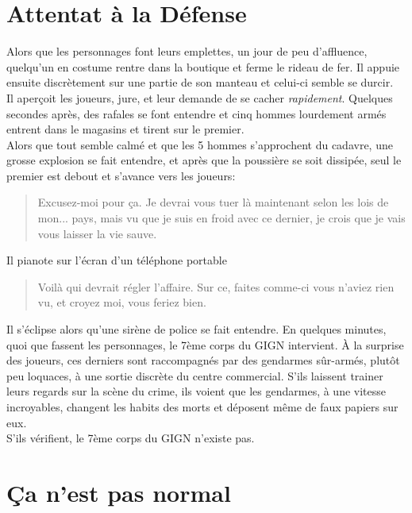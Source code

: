 \documentclass[10pt,a4paper,twocolumn]{article}
\begin{document}
\section{Attentat à la Défense}
Alors que les personnages font leurs emplettes, un jour de peu d'affluence, quelqu'un en costume rentre dans la boutique et ferme le rideau de fer. Il appuie ensuite discrètement sur une partie de son manteau et celui-ci semble se durcir.\\
Il aperçoit les joueurs, jure, et leur demande de se cacher \emph{rapidement}. Quelques secondes après, des rafales se font entendre et cinq hommes lourdement armés entrent dans le magasins et tirent sur le premier.\\
Alors que tout semble calmé et que les 5 hommes s'approchent du cadavre, une grosse explosion se fait entendre, et après que la poussière se soit dissipée, seul le premier est debout et s'avance vers les joueurs:
\begin{quote}
Excusez-moi pour ça. Je devrai vous tuer là maintenant selon les lois de mon... pays, mais vu que je suis en froid avec ce dernier, je crois que je vais vous laisser la vie sauve.
\end{quote}
Il pianote sur l'écran d'un téléphone portable %
\begin{quote}
Voilà qui devrait régler l'affaire. Sur ce, faites comme-ci vous n'aviez rien vu, et croyez moi, vous feriez bien.
\end{quote}
Il s'éclipse alors qu'une sirène de police se fait entendre. En quelques minutes, quoi que fassent les personnages, le 7ème corps du GIGN intervient. À la surprise des joueurs, ces derniers sont raccompagnés par des gendarmes sûr-armés, plutôt peu loquaces, à une sortie discrète du centre commercial. S'ils laissent trainer leurs regards sur la scène du crime, ils voient que les gendarmes, à une vitesse incroyables, changent les habits des morts et déposent même de faux papiers sur eux.
\\
S'ils vérifient, le 7ème corps du GIGN n'existe pas.

\section{Ça n'est pas normal}
\end{document}
